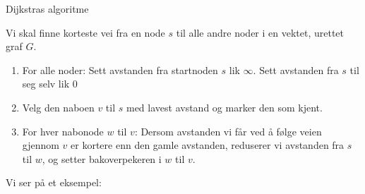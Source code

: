\begin{teorem}Dijkstras algoritme

Vi skal finne korteste vei fra en node $ s $ til alle andre noder i en vektet, urettet graf $ G $. 
\begin{enumerate}
\item For alle noder: Sett avstanden fra startnoden $ s $ lik $ \infty $. Sett avstanden fra $ s $ til seg selv lik 0
\item Velg den naboen $ v $ til $ s $ med lavest avstand og marker den som kjent.
\item For hver nabonode $ w $ til $ v $: Dersom avstanden vi får ved å følge veien gjennom $ v $ er kortere enn den gamle avstanden, reduserer vi avstanden fra $ s $ til $ w $, og setter bakoverpekeren i $ w $ til $ v $. 
\end{enumerate}
\end{teorem}

\newpage
\noindent Vi ser på et eksempel:

